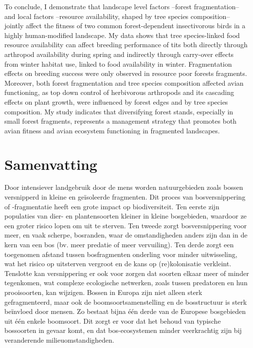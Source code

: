 \documentclass[10pt, twoside]{book} %
\begin{document}
To conclude, I demonstrate that landscape level factors --forest fragmentation-- and local factors --resource availability, shaped by tree species composition-- jointly affect the fitness of two common forest-dependent insectivorous birds in a highly human-modified landscape. My data shows that tree species-linked food resource availability can affect breeding performance of tits both directly through arthropod availability during spring and indirectly through carry-over effects from winter habitat use, linked to food availability in winter. Fragmentation effects on breeding success were only observed in resource poor forests fragments. Moreover, both forest fragmentation and tree species composition affected avian functioning, as top down control of herbivorous arthropods and its cascading effects on plant growth, were influenced by forest edges and by tree species composition. My study indicates that diversifying forest stands, especially in small forest fragments, represents a management strategy that promotes both avian fitness and avian ecosystem functioning in fragmented landscapes.\\


\newpage
\thispagestyle{empty}
\chapter*{Samenvatting}

Door intensiever landgebruik door de mens worden natuurgebieden zoals bossen versnipperd in kleine en ge\"{i}soleerde fragmenten. Dit proces van bosversnippering of -fragmentatie heeft een grote impact op biodiversiteit. Ten eerste zijn populaties van dier- en plantensoorten kleiner in kleine bosgebieden, waardoor ze een groter risico lopen om uit te sterven. Ten tweede zorgt bosversnippering voor meer, en vaak scherpe, bosranden, waar de omstandigheden anders zijn dan in de kern van een bos (bv. meer predatie of meer vervuiling). Ten derde zorgt een toegenomen afstand tussen bosfragmenten onderling voor minder uitwisseling, wat het risico op uitsterven vergroot en de kans op (re)kolonisatie verkleint. Tenslotte kan versnippering er ook voor zorgen dat soorten elkaar meer of minder tegenkomen, wat complexe ecologische netwerken, zoals tussen predatoren en hun prooisoorten, kan wijzigen. Bossen in Europa zijn niet alleen sterk gefragmenteerd, maar ook de boomsoortsamenstelling en de bosstructuur is sterk be\"{i}nvloed door mensen. Zo bestaat bijna \'{e}\'{e}n derde van de Europese bosgebieden uit \'{e}\'{e}n enkele boomsoort. Dit zorgt er voor dat het behoud van typische bossoorten in gevaar komt, en dat bos-ecosystemen minder veerkrachtig zijn bij veranderende milieuomstandigheden.\\
\end{document}
